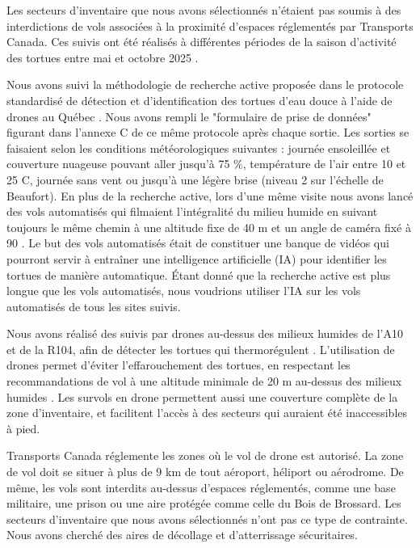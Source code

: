 Les secteurs d’inventaire que nous avons sélectionnés n’étaient pas soumis à des interdictions de vols associées à la proximité d'espaces réglementés par Transports Canada. Ces suivis ont été réalisés à différentes périodes de la saison d'activité des tortues entre mai et octobre 2025 \citep{boyer1965, obbard1981, lefevre1995}.

Nous avons suivi la méthodologie de recherche active proposée dans le protocole standardisé de détection et d'identification des tortues d'eau douce à l'aide de drones au Québec \citep{mffp2021}. Nous avons rempli le "formulaire de prise de données" figurant dans l'annexe C de ce même protocole après chaque sortie. Les sorties se faisaient selon les conditions météorologiques suivantes : journée ensoleillée et couverture nuageuse pouvant aller jusqu’à 75 \%, température de l’air entre 10 et 25 \textdegree C, journée sans vent ou jusqu’à une légère brise (niveau 2 sur l’échelle de Beaufort). En plus de la recherche active, lors d’une même visite nous avons lancé des vols automatisés qui filmaient l’intégralité du milieu humide en suivant toujours le même chemin à une altitude fixe de 40 m et un angle de caméra fixé à 90 \textdegree. Le but des vols automatisés était de constituer une banque de vidéos qui pourront servir à entraîner une intelligence artificielle (IA) pour identifier les tortues de manière automatique. Étant donné que la recherche active est plus longue que les vols automatisés,  nous voudrions utiliser l’IA sur les vols automatisés de tous les sites suivis.


Nous avons réalisé des suivis par drones au-dessus des milieux humides de l'A10 et de la R104, afin de détecter les tortues qui thermorégulent \citep{aota2021, bogolin2021, bevan2018}. L'utilisation de drones permet d'éviter l'effarouchement des tortues, en respectant les recommandations de vol à une altitude minimale de 20 m au-dessus des milieux humides \citep{charbonneau2021}. Les survols en drone permettent aussi une couverture complète de la zone d’inventaire, et facilitent l’accès à des secteurs qui auraient été inaccessibles à pied.

Transports Canada réglemente les zones où le vol de drone est autorisé. La zone de vol doit se situer à plus de 9 km de tout aéroport, héliport ou aérodrome. De même, les vols sont interdits au-dessus d’espaces réglementés, comme une base militaire, une prison ou une aire protégée comme celle du Bois de Brossard. Les secteurs d’inventaire que nous avons sélectionnés n’ont pas ce type de contrainte. Nous avons cherché des aires de décollage et d’atterrissage sécuritaires. 

